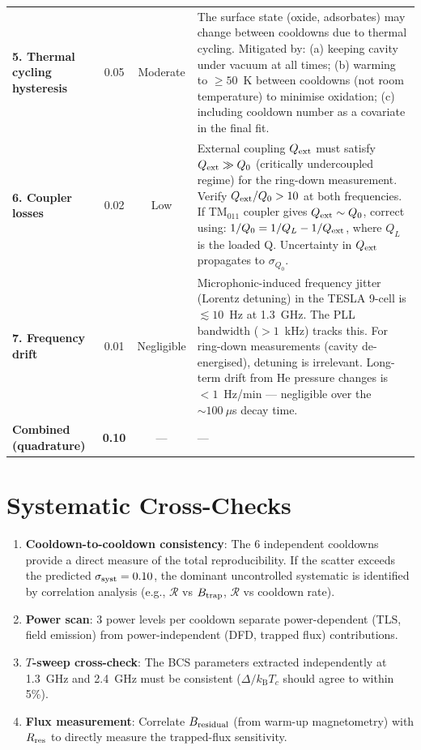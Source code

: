 \documentclass[11pt]{article}
\newcommand{\kB}{k_{\mathrm{B}}}
\theoremstyle{definition}
\theoremstyle{remark}
\begin{document}
\begin{table}[H]
\begin{tabular}{@{}p{3.5cm}ccp{5cm}@{}}
\textbf{5. Thermal cycling hysteresis}
& 0.05 & Moderate
& The surface state (oxide, adsorbates) may change between cooldowns
due to thermal cycling. Mitigated by: (a) keeping cavity under vacuum
at all times; (b) warming to $\geq 50$~K between cooldowns (not room
temperature) to minimise oxidation; (c) including cooldown number
as a covariate in the final fit. \\

\textbf{6. Coupler losses}
& 0.02 & Low
& External coupling $Q_{\rm ext}$ must satisfy
$Q_{\rm ext} \gg Q_0$ (critically undercoupled regime) for
the ring-down measurement. Verify $Q_{\rm ext}/Q_0 > 10$ at
both frequencies. If TM$_{011}$ coupler gives
$Q_{\rm ext} \sim Q_0$, correct using:
$1/Q_0 = 1/Q_L - 1/Q_{\rm ext}$, where $Q_L$ is the loaded Q.
Uncertainty in $Q_{\rm ext}$ propagates to $\sigma_{Q_0}$. \\

\textbf{7. Frequency drift}
& 0.01 & Negligible
& Microphonic-induced frequency jitter (Lorentz detuning) in the
TESLA 9-cell is $\lesssim 10$~Hz at 1.3~GHz. The PLL bandwidth
($> 1$~kHz) tracks this. For ring-down measurements (cavity
de-energised), detuning is irrelevant. Long-term drift from He
pressure changes is $< 1$~Hz/min --- negligible over the
$\sim 100~\mu$s decay time. \\

\midrule
\textbf{Combined (quadrature)}
& \textbf{0.10} & ---
& --- \\
\bottomrule
\end{tabular}
\end{table}


\section{Systematic Cross-Checks}

\begin{enumerate}
\item \textbf{Cooldown-to-cooldown consistency}: The 6 independent
  cooldowns provide a direct measure of the total reproducibility.
  If the scatter exceeds the predicted $\sigma_{\rm syst} = 0.10$,
  the dominant uncontrolled systematic is identified by correlation
  analysis (e.g., $\mathcal{R}$ vs $B_{\rm trap}$, $\mathcal{R}$
  vs cooldown rate).

\item \textbf{Power scan}: 3 power levels per cooldown separate
  power-dependent (TLS, field emission) from power-independent
  (DFD, trapped flux) contributions.

\item \textbf{$T$-sweep cross-check}: The BCS parameters extracted
  independently at 1.3~GHz and 2.4~GHz must be consistent
  ($\Delta/\kB T_c$ should agree to within 5\%).

\item \textbf{Flux measurement}: Correlate $B_{\rm residual}$
  (from warm-up magnetometry) with $R_{\rm res}$ to directly
  measure the trapped-flux sensitivity.
\end{enumerate}
\end{document}
